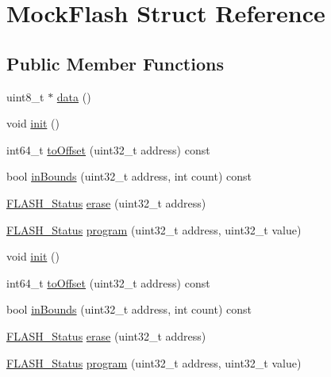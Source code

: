\hypertarget{structMockFlash}{\section{Mock\+Flash Struct Reference}
\label{structMockFlash}
}
\subsection*{Public Member Functions}
\begin{DoxyCompactItemize}
\item 
uint8\+\_\+t $\ast$ \hyperlink{structMockFlash_ac678c7aacf9f87ac7237f8fff923c151}{data} ()
\item 
void \hyperlink{structMockFlash_aa57666a85c11e10c1fab1ff33403161e}{init} ()
\item 
int64\+\_\+t \hyperlink{structMockFlash_ab34a33a9ba2eb194b6bac4a1eac35e4d}{to\+Offset} (uint32\+\_\+t address) const 
\item 
bool \hyperlink{structMockFlash_afb86f5d44fed37c2f5253c28fd24af83}{in\+Bounds} (uint32\+\_\+t address, int count) const 
\item 
\hyperlink{test_2unit_2platform_8h_adc63a6f3404ff1f71229a66915e9cdc0}{F\+L\+A\+S\+H\+\_\+\+Status} \hyperlink{structMockFlash_aa0d5368a71dff0fee7695c8d3819cff6}{erase} (uint32\+\_\+t address)
\item 
\hyperlink{test_2unit_2platform_8h_adc63a6f3404ff1f71229a66915e9cdc0}{F\+L\+A\+S\+H\+\_\+\+Status} \hyperlink{structMockFlash_a53ba4304796c2ca333f6731cb7e5c5a4}{program} (uint32\+\_\+t address, uint32\+\_\+t value)
\item 
void \hyperlink{structMockFlash_aa57666a85c11e10c1fab1ff33403161e}{init} ()
\item 
int64\+\_\+t \hyperlink{structMockFlash_ab34a33a9ba2eb194b6bac4a1eac35e4d}{to\+Offset} (uint32\+\_\+t address) const 
\item 
bool \hyperlink{structMockFlash_afb86f5d44fed37c2f5253c28fd24af83}{in\+Bounds} (uint32\+\_\+t address, int count) const 
\item 
\hyperlink{test_2unit_2platform_8h_adc63a6f3404ff1f71229a66915e9cdc0}{F\+L\+A\+S\+H\+\_\+\+Status} \hyperlink{structMockFlash_aa0d5368a71dff0fee7695c8d3819cff6}{erase} (uint32\+\_\+t address)
\item 
\hyperlink{test_2unit_2platform_8h_adc63a6f3404ff1f71229a66915e9cdc0}{F\+L\+A\+S\+H\+\_\+\+Status} \hyperlink{structMockFlash_a53ba4304796c2ca333f6731cb7e5c5a4}{program} (uint32\+\_\+t address, uint32\+\_\+t value)
\end{DoxyCompactItemize}
